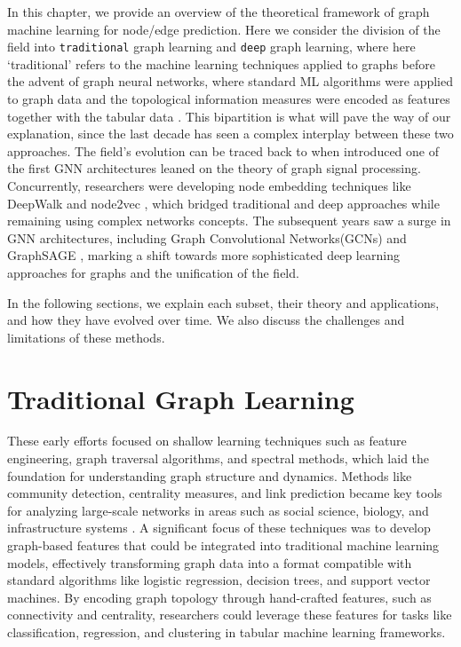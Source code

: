 In this chapter, we provide an overview of the theoretical framework of graph machine learning for node/edge prediction. Here we consider the division of the field into \texttt{traditional} graph learning and \texttt{deep} graph learning, where here `traditional' refers to the machine learning techniques applied to graphs before the advent of graph neural networks, where standard ML algorithms were applied to graph data and the topological information measures were encoded as features together with the tabular data  \cite{costa2007characterization, silva2016machine}. This bipartition is what will pave the way of our explanation, since the last decade has seen a complex interplay between these two approaches. The field's evolution can be traced back to when  introduced one of the first GNN architectures leaned on the theory of graph signal processing. Concurrently, researchers were developing node embedding techniques like DeepWalk \cite{perozzi2014deepwalk} and node2vec \cite{grover2016node2vec}, which bridged traditional and deep approaches while remaining using complex networks concepts. The subsequent years saw a surge in GNN architectures, including Graph Convolutional Networks(GCNs) \cite{kipf2016semi} and GraphSAGE \cite{hamilton2017inductive}, marking a shift towards more sophisticated deep learning approaches for graphs and the unification of the field.

In the following sections, we explain each subset, their theory and applications, and how they have evolved over time. We also discuss the challenges and limitations of these methods.

\section{Traditional Graph Learning}

\label{classical_learning}

These early efforts focused on shallow learning techniques such as feature engineering, graph traversal algorithms, and spectral methods, which laid the foundation for understanding graph structure and dynamics. Methods like community detection, centrality measures, and link prediction \cite{silva2016machine} became key tools for analyzing large-scale networks in areas such as social science, biology, and infrastructure systems \cite{newman2018networks,boccaletti2006complex}. A significant focus of these techniques was to develop graph-based features that could be integrated into traditional machine learning models, effectively transforming graph data into a format compatible with standard algorithms like logistic regression, decision trees, and support vector machines. By encoding graph topology through hand-crafted features, such as connectivity and centrality, researchers could leverage these features for tasks like classification, regression, and clustering in tabular machine learning frameworks.

